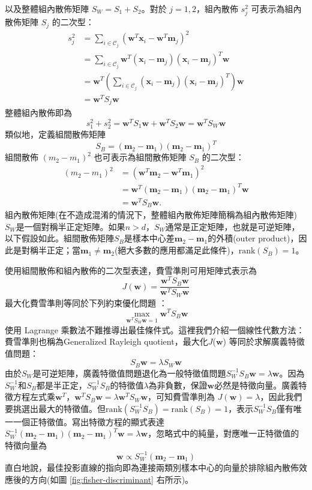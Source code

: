 \documentclass[12pt, a4paper]{article}
\begin{document}
以及整體組內散佈矩陣 $S_W=S_1+S_2$。對於 $j=1,2$，組內散佈 $s_j^2$ 可表示為組內散佈矩陣 $S_j$ 的二次型：
$$\displaystyle\begin{aligned}  s_j^2&=\sum_{i\in\mathcal{C}_j}\left(\mathbf{w}^T\mathbf{x}_i-\mathbf{w}^T\mathbf{m}_j\right)^2\\  &=\sum_{i\in\mathcal{C}_j}\mathbf{w}^T(\mathbf{x}_i-\mathbf{m}_j)(\mathbf{x}_i-\mathbf{m}_j)^T\mathbf{w}\\  &=\mathbf{w}^T\left(\sum_{i\in\mathcal{C}_j}(\mathbf{x}_i-\mathbf{m}_j)(\mathbf{x}_i-\mathbf{m}_j)^T\right)\mathbf{w}\\  &=\mathbf{w}^TS_j\mathbf{w}\end{aligned}$$
整體組內散佈即為
$$\displaystyle s_1^2+s_2^2=\mathbf{w}^TS_1\mathbf{w}+\mathbf{w}^TS_2\mathbf{w}=\mathbf{w}^TS_W\mathbf{w}$$
類似地，定義組間散佈矩陣
$$\displaystyle  S_B=(\mathbf{m}_2-\mathbf{m}_1)(\mathbf{m}_2-\mathbf{m}_1)^T$$
組間散佈 $(m_2-m_1)^2$ 也可表示為組間散佈矩陣 $S_B$ 的二次型：
$$\displaystyle\begin{aligned}  (m_2-m_1)^2&=\left(\mathbf{w}^T\mathbf{m}_2-\mathbf{w}^T\mathbf{m}_1\right)^2\\  &=\mathbf{w}^T(\mathbf{m}_2-\mathbf{m}_1)(\mathbf{m}_2-\mathbf{m}_1)^T\mathbf{w}\\  &=\mathbf{w}^TS_B\mathbf{w}.  \end{aligned}$$
組內散佈矩陣(在不造成混淆的情況下，整體組內散佈矩陣簡稱為組內散佈矩陣)$S_W$是一個對稱半正定矩陣。如果$n>d$，$S_W$通常是正定矩陣，也就是可逆矩陣，以下假設如此。組間散佈矩陣$S_B$是樣本中心差$\mathbf{m}_2-\mathbf{m}_1$的外積(outer product)，因此是對稱半正定；當$\mathbf{m}_1\neq\mathbf{m}_2$(絕大多數的應用都滿足此條件)，$\text{rank}(S_B)=1$。

使用組間散佈和組內散佈的二次型表達，費雪準則可用矩陣式表示為
$$\displaystyle  J(\mathbf{w})=\frac{\mathbf{w}^TS_B\mathbf{w}}{\mathbf{w}^TS_W\mathbf{w}}$$
最大化費雪準則等同於下列約束優化問題 ：
$$\displaystyle  \max_{\mathbf{w}^TS_W\mathbf{w}=1}\mathbf{w}^TS_B\mathbf{w}$$
使用 Lagrange 乘數法不難推導出最佳條件式。這裡我們介紹一個線性代數方法：費雪準則也稱為Generalized Rayleigh quotient，最大化$J$($\mathbf{w}$) 等同於求解廣義特徵值問題：
$$\displaystyle  S_B\mathbf{w}=\lambda S_W\mathbf{w}$$
由於$S_W$是可逆矩陣，廣義特徵值問題退化為一般特徵值問題$S_W^{-1}S_B\mathbf{w}=\lambda\mathbf{w}$。因為$S_W^{-1}$和$S_B$都是半正定，$S_W^{-1}S_B$的特徵值$\lambda$為非負數，保證$\mathbf{w}$必然是特徵向量。廣義特徵方程左式乘$\mathbf{w}^T$，$\mathbf{w}^TS_B\mathbf{w}=\lambda\mathbf{w}^TS_W\mathbf{w}$，可知費雪準則為 $J(\mathbf{w})=\lambda$，因此我們要挑選出最大的特徵值。但$\text{rank}(S_W^{-1}S_B)=\text{rank}(S_B)=1$，表示$S_W^{-1}S_B$僅有唯一一個正特徵值。寫出特徵方程的顯式表達$\displaystyle  S_W^{-1}(\mathbf{m}_2-\mathbf{m}_1)(\mathbf{m}_2-\mathbf{m}_1)^T\mathbf{w}=\lambda\mathbf{w}$，忽略式中的純量，對應唯一正特徵值的特徵向量為
$$\displaystyle  \mathbf{w}\propto S_W^{-1}(\mathbf{m}_2-\mathbf{m}_1)$$
直白地說，最佳投影直線的指向即為連接兩類別樣本中心的向量於排除組內散佈效應後的方向(如圖 \ref{fig:fisher-discriminant} 右所示)。
\end{document}
